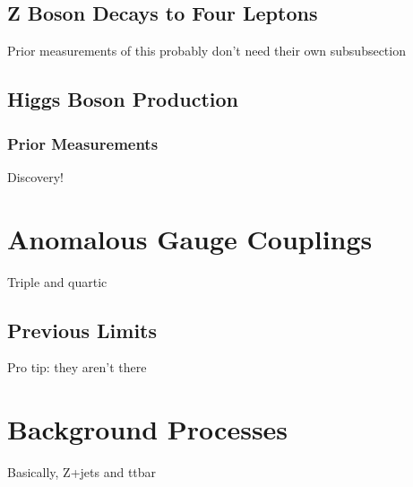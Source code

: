 \subsection{Z Boson Decays to Four Leptons}
Prior measurements of this probably don't need their own subsubsection


\subsection{Higgs Boson Production}\label{sec:Hproduction}

\subsubsection{Prior Measurements}\label{sec:Hresults}
Discovery!



\section{Anomalous Gauge Couplings}
Triple and quartic

\subsection{Previous Limits}
Pro tip: they aren't there



\section{Background Processes}
Basically, Z+jets and ttbar
